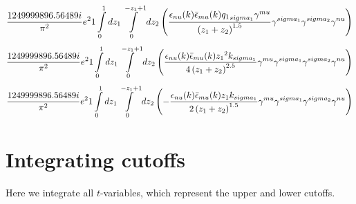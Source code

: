 \begin{dmath}\frac{1249999896.56489 i}{\pi^{2}} e^{2}1\int\limits_{ 0 }^{ 1 } d{ z_{ 1 } }\int\limits_{ 0 }^{ - { z_{ 1 } } + 1 } d{ z_{ 2 } }\left(\frac{\epsilon_{ \\nu }({ k }) \bar{\epsilon}_{ \\mu }({ k }) { { q_1 }_{ \\sigma_1 } } { \gamma^{ \\mu } }}{\left({ z_{ 1 } } + { z_{ 2 } }\right)^{1.5}} { \gamma^{ \\sigma_1 } } { \gamma^{ \\sigma_2 } } { \gamma^{ \\nu } }\right)\end{dmath}
\begin{dmath}\frac{1249999896.56489 i}{\pi^{2}} e^{2}1\int\limits_{ 0 }^{ 1 } d{ z_{ 1 } }\int\limits_{ 0 }^{ - { z_{ 1 } } + 1 } d{ z_{ 2 } }\left(\frac{\epsilon_{ \\nu }({ k }) \bar{\epsilon}_{ \\mu }({ k }) { z_{ 1 } }^{2} { { k }_{ \\sigma_1 } }}{4 \left({ z_{ 1 } } + { z_{ 2 } }\right)^{2.5}} { \gamma^{ \\mu } } { \gamma^{ \\sigma_1 } } { \gamma^{ \\sigma_2 } } { \gamma^{ \\nu } }\right)\end{dmath}
\begin{dmath}\frac{1249999896.56489 i}{\pi^{2}} e^{2}1\int\limits_{ 0 }^{ 1 } d{ z_{ 1 } }\int\limits_{ 0 }^{ - { z_{ 1 } } + 1 } d{ z_{ 2 } }\left(- \frac{\epsilon_{ \\nu }({ k }) \bar{\epsilon}_{ \\mu }({ k }) { z_{ 1 } } { { k }_{ \\sigma_1 } }}{2 \left({ z_{ 1 } } + { z_{ 2 } }\right)^{1.5}} { \gamma^{ \\mu } } { \gamma^{ \\sigma_1 } } { \gamma^{ \\sigma_2 } } { \gamma^{ \\nu } }\right)\end{dmath}
\section*{Integrating cutoffs}
Here we integrate all $t$-variables, which represent the upper and lower cutoffs.

